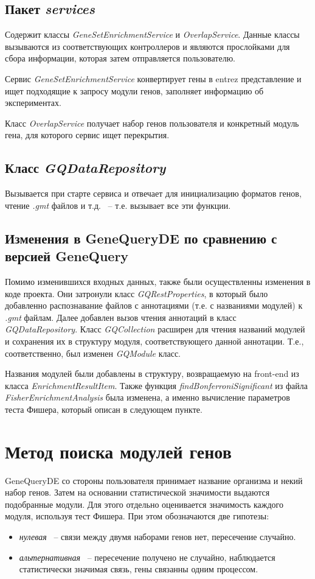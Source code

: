 \documentclass[times,specification,annotation]{itmo-student-thesis}
\begin{document}
\subsection{Пакет \textit{services}}
Содержит классы \textit{GeneSetEnrichmentService} и \textit{OverlapService}. Данные классы вызываются из соответствующих контроллеров и являются прослойками для сбора информации, которая затем отправляется пользователю.

Сервис \textit{GeneSetEnrichmentService} конвертирует гены в entrez представление и ищет подходящие к запросу модули генов, заполняет информацию об экспериментах.

Класс \textit{OverlapService} получает набор генов пользователя и конкретный модуль гена, для которого сервис ищет перекрытия. 

\subsection{Класс \textit{GQDataRepository}}
Вызывается при старте сервиса и отвечает для инициализацию форматов генов, чтение \textit{.gmt} файлов и т.д. ~-- т.е. вызывает все эти функции.  

\subsection{Изменения в GeneQueryDE по сравнению с версией GeneQuery}
Помимо изменившихся входных данных, также были осуществленны изменения в коде проекта. Они затронули класс \textit{GQRestProperties}, в который было добавленно распознавание файлов с аннотациями (т.е. с названиями модулей) к \textit{.gmt} файлам. Далее добавлен вызов чтения аннотаций в класс \textit{GQDataRepository}. Класс \textit{GQCollection} расширен для чтения названий модулей и сохранения их в структуру модуля, соответствующего данной аннотации. Т.е., соответственно, был изменен \textit{GQModule} класс.

Названия модулей были добавлены в структуру, возвращаемую на front-end из класса \textit{EnrichmentResultItem}. Также функция \textit{findBonferroniSignificant} из файла \textit{FisherEnrichmentAnalysis} была изменена, а именно вычисление параметров теста Фишера, который описан в следующем пункте.

\section{Метод поиска модулей генов}

GeneQueryDE со стороны пользователя принимает название организма и некий набор генов. Затем на основании статистической значимости выдаются подобранные модули. Для этого отдельно оценивается значимость каждого модуля, используя тест Фишера. При этом обозначаются две гипотезы:
\begin{itemize}
    \item \textit{нулевая} ~-- связи между двумя наборами генов нет, пересечение случайно.
    \item \textit{альтернативная} ~-- пересечение получено не случайно, наблюдается статистически значимая связь, гены связанны одним процессом.
\end{itemize}
\end{document}
